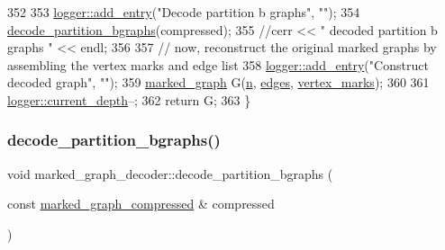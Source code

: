\begin{DoxyCode}
352 
353   \hyperlink{classlogger_a710163deb17bc81f70d53d285b8ac9ac}{logger::add\_entry}(\textcolor{stringliteral}{"Decode partition b graphs"}, \textcolor{stringliteral}{""});
354   \hyperlink{classmarked__graph__decoder_aea53529191c7d56a897620b3d842ffaa}{decode\_partition\_bgraphs}(compressed);
355   \textcolor{comment}{//cerr << " decoded partition b graphs " << endl;}
356 
357   \textcolor{comment}{// now, reconstruct the original marked graphs by assembling the vertex marks and edge list}
358   \hyperlink{classlogger_a710163deb17bc81f70d53d285b8ac9ac}{logger::add\_entry}(\textcolor{stringliteral}{"Construct decoded graph"}, \textcolor{stringliteral}{""});
359   \hyperlink{classmarked__graph}{marked\_graph} G(\hyperlink{classmarked__graph__decoder_aefc93611bc4a3e9a5d3956d97649a0e9}{n}, \hyperlink{classmarked__graph__decoder_af9e75da0a495d9c3bdcd169e15e3261e}{edges}, \hyperlink{classmarked__graph__decoder_a98be932a5abff7efbc8dd4290268b69a}{vertex\_marks});
360 
361   \hyperlink{classlogger_a9d29b49bd318a719a8e85b59eac54fe0}{logger::current\_depth}--;
362   \textcolor{keywordflow}{return} G;
363 \}
\end{DoxyCode}
\mbox{\label{classmarked__graph__decoder_aea53529191c7d56a897620b3d842ffaa}} 
\subsubsection{\texorpdfstring{decode\+\_\+partition\+\_\+bgraphs()}{decode\_partition\_bgraphs()}}
{\footnotesize\ttfamily void marked\+\_\+graph\+\_\+decoder\+::decode\+\_\+partition\+\_\+bgraphs (\begin{DoxyParamCaption}\item[{const \hyperlink{classmarked__graph__compressed}{marked\+\_\+graph\+\_\+compressed} \&}]{compressed }\end{DoxyParamCaption})\hspace{0.3cm}{\ttfamily [private]}}


